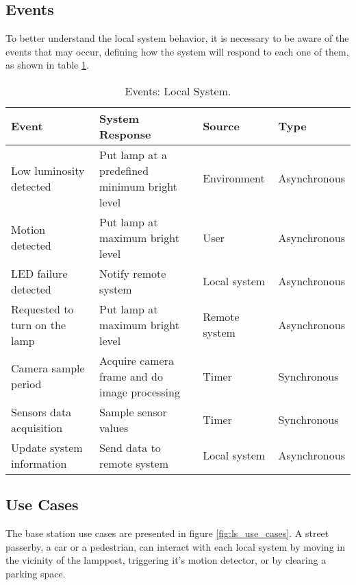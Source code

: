 \subsection{Events}
To better understand the local system behavior, it is necessary to be aware of the events that may occur, defining how the system will respond to each one of them, as shown in table \ref{table:ls_events}. 

\begin{table}[ht]
	\centering
	\resizebox{\columnwidth}{!}
	{

	\begin{tabular}{|m{3cm}|m{5cm}|m{2.4cm}|m{2.4cm}|}
		\hline
		\textbf{Event} & \textbf{System Response} & \textbf{Source} & \textbf{Type}\\
		\hline\hline
		Low luminosity detected & Put lamp at a predefined minimum bright level & Environment & Asynchronous\\
		\hline
		
		Motion detected & Put lamp at maximum bright level & User & Asynchronous\\
		\hline
		
		LED failure detected & Notify remote system & Local system & Asynchronous\\
		\hline
		
		Requested to turn on the lamp & Put lamp at maximum bright level & Remote system & Asynchronous\\
		\hline
		
		Camera sample period & Acquire camera frame and do image processing & Timer & Synchronous\\
		\hline
		
		Sensors data acquisition & Sample sensor values & Timer & Synchronous\\
		\hline
		
		Update system information & Send data to remote system & Local system & Asynchronous\\
		\hline
	\end{tabular}
	}
	\caption{Events: Local System.}
	\label{table:ls_events}
\end{table}

\clearpage
\subsection{Use Cases}
The base station use cases are presented in figure \ref{fig:ls_use_cases}. A street passerby, a car or a pedestrian, can interact with each local system by moving in the vicinity of the lamppost, triggering it's motion detector, or by clearing a parking space.

